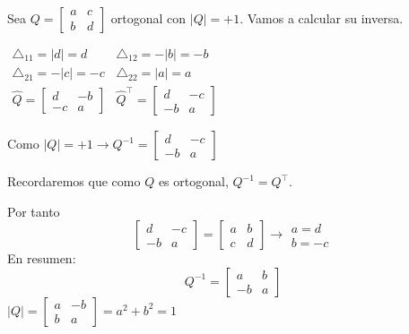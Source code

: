 Sea $Q=\begin{bmatrix}
	a & c\\
	b & d
\end{bmatrix}$ ortogonal con $|Q|=+1$. Vamos a calcular su inversa.

$\begin{array}{ll}
	\triangle_{11}=|d|=d & \triangle_{12}=-|b|=-b\\
	\triangle_{21}=-|c|=-c & \triangle_{22}=|a|=a\\
	\hat{Q}=\begin{bmatrix}
		d & -b\\
		-c & a
	\end{bmatrix} & \hat{Q}^\intercal =\begin{bmatrix}
	d & -c\\
	-b & a
	\end{bmatrix}
\end{array}$

Como $|Q|=+1\longrightarrow Q^{-1}=\begin{bmatrix}
	d & -c\\
	-b & a
\end{bmatrix}$

Recordaremos que como $Q$ es ortogonal, $Q^{-1}=Q^\intercal $.

Por tanto \[ \begin{bmatrix}
	d & -c\\
	-b & a
\end{bmatrix}=\begin{bmatrix}
a & b\\
c & d
\end{bmatrix}\longrightarrow\begin{array}{l}
a=d\\
b=-c
\end{array} \]En resumen:\[ Q^{-1}=\begin{bmatrix}
a & b\\
-b & a
\end{bmatrix} \]$|Q|=\begin{bmatrix}
a & -b\\
b & a
\end{bmatrix}=a^2+b^2=1 $